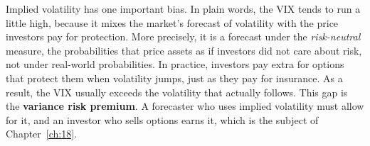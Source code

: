 Implied volatility has one important bias. In plain words, the VIX tends to run a little high, because it mixes the market's forecast of volatility with the price investors pay for protection. More precisely, it is a forecast under the \emph{risk-neutral} measure, the probabilities that price assets as if investors did not care about risk, not under real-world probabilities. In practice, investors pay extra for options that protect them when volatility jumps, just as they pay for insurance. As a result, the VIX usually exceeds the volatility that actually follows. This gap is the \textbf{variance risk premium}. A forecaster who uses implied volatility must allow for it, and an investor who sells options earns it, which is the subject of Chapter~\ref{ch:18}.

